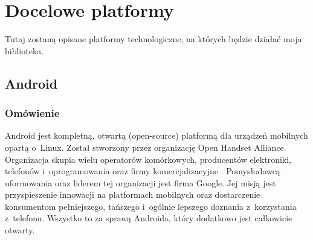 %

\section{Docelowe platformy}
Tutaj zostaną opisane platformy technologiczne, na których będzie działać moja biblioteka.

\subsection{Android}

\subsubsection{Omówienie}
Android jest kompletną, otwartą (open-source) platformą dla urządzeń mobilnych opartą o~Linux\cite{learningandroid}. Został stworzony przez organizację Open Handset Alliance. Organizacja skupia wielu operatorów komórkowych, producentów elektroniki, telefonów i~oprogramowania oraz firmy komercjalizacyjne \cite{oha}. Pomysłodawcą uformowania oraz liderem tej organizacji jest firma Google. Jej misją jest przyspieszenie innowacji na platformach mobilnych oraz dostarczenie konsumentom pełniejszego, tańszego i~ogólnie lepszego doznania z~korzystania z~telefonu. Wszystko to za sprawą Androida, który dodatkowo jest całkowicie otwarty.

